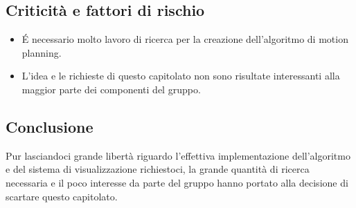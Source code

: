 \subsection{Criticità e fattori di rischio}
\begin{itemize}
\item É necessario molto lavoro di ricerca per la creazione dell'algoritmo di motion planning.
\item L'idea e le richieste di questo capitolato non sono risultate interessanti alla maggior parte dei componenti del gruppo.
\end{itemize}

\subsection{Conclusione}
Pur lasciandoci grande libertà riguardo l'effettiva implementazione dell'algoritmo e del sistema di visualizzazione richiestoci, la grande quantità di ricerca necessaria e il poco interesse da parte del gruppo hanno portato alla decisione di scartare questo capitolato.